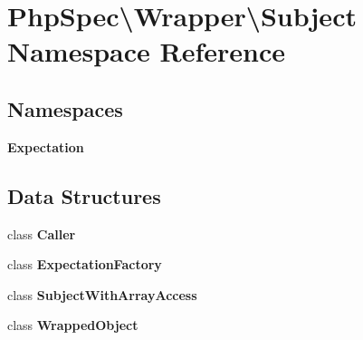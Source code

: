 \section{Php\+Spec\textbackslash{}Wrapper\textbackslash{}Subject Namespace Reference}
\label{namespace_php_spec_1_1_wrapper_1_1_subject}
\subsection*{Namespaces}
\begin{DoxyCompactItemize}
\item 
 {\bf Expectation}
\end{DoxyCompactItemize}
\subsection*{Data Structures}
\begin{DoxyCompactItemize}
\item 
class {\bf Caller}
\item 
class {\bf Expectation\+Factory}
\item 
class {\bf Subject\+With\+Array\+Access}
\item 
class {\bf Wrapped\+Object}
\end{DoxyCompactItemize}
